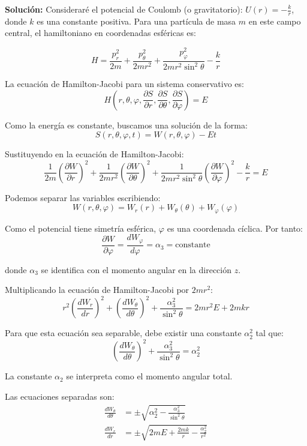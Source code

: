 \documentclass[12pt]{article}
\begin{document}
\begin{enumerate}
  \textbf{Solución:}
  Consideraré el potencial de Coulomb (o gravitatorio): $U(r) = -\frac{k}{r}$, donde $k$ es una constante positiva. Para una partícula de masa $m$ en este campo central, el hamiltoniano en coordenadas esféricas es:

  \[
  H = \frac{p_r^2}{2m} + \frac{p_\theta^2}{2mr^2} + \frac{p_\varphi^2}{2mr^2\sin^2\theta} - \frac{k}{r}
  \]

  La ecuación de Hamilton-Jacobi para un sistema conservativo es:
  \[
  H\left(r,\theta,\varphi,\frac{\partial S}{\partial r},\frac{\partial S}{\partial \theta},\frac{\partial S}{\partial \varphi}\right) = E
  \]

  Como la energía es constante, buscamos una solución de la forma:
  \[
  S(r,\theta,\varphi,t) = W(r,\theta,\varphi) - Et
  \]

  Sustituyendo en la ecuación de Hamilton-Jacobi:
  \[
  \frac{1}{2m}\left(\frac{\partial W}{\partial r}\right)^2 + \frac{1}{2mr^2}\left(\frac{\partial W}{\partial \theta}\right)^2 + \frac{1}{2mr^2\sin^2\theta}\left(\frac{\partial W}{\partial \varphi}\right)^2 - \frac{k}{r} = E
  \]

  Podemos separar las variables escribiendo:
  \[
  W(r,\theta,\varphi) = W_r(r) + W_\theta(\theta) + W_\varphi(\varphi)
  \]

  Como el potencial tiene simetría esférica, $\varphi$ es una coordenada cíclica. Por tanto:
  \[
  \frac{\partial W}{\partial \varphi} = \frac{dW_\varphi}{d\varphi} = \alpha_3 = \text{constante}
  \]

  donde $\alpha_3$ se identifica con el momento angular en la dirección $z$.

  Multiplicando la ecuación de Hamilton-Jacobi por $2mr^2$:
  \[
  r^2\left(\frac{dW_r}{dr}\right)^2 + \left(\frac{dW_\theta}{d\theta}\right)^2 + \frac{\alpha_3^2}{\sin^2\theta} = 2mr^2E + 2mkr
  \]

  Para que esta ecuación sea separable, debe existir una constante $\alpha_2^2$ tal que:
  \[
  \left(\frac{dW_\theta}{d\theta}\right)^2 + \frac{\alpha_3^2}{\sin^2\theta} = \alpha_2^2
  \]

  La constante $\alpha_2$ se interpreta como el momento angular total.

  Las ecuaciones separadas son:
  \begin{align}
  \frac{dW_\theta}{d\theta} &= \pm\sqrt{\alpha_2^2 - \frac{\alpha_3^2}{\sin^2\theta}} \\
  \frac{dW_r}{dr} &= \pm\sqrt{2mE + \frac{2mk}{r} - \frac{\alpha_2^2}{r^2}}
  \end{align}


\end{enumerate}
\end{document}
